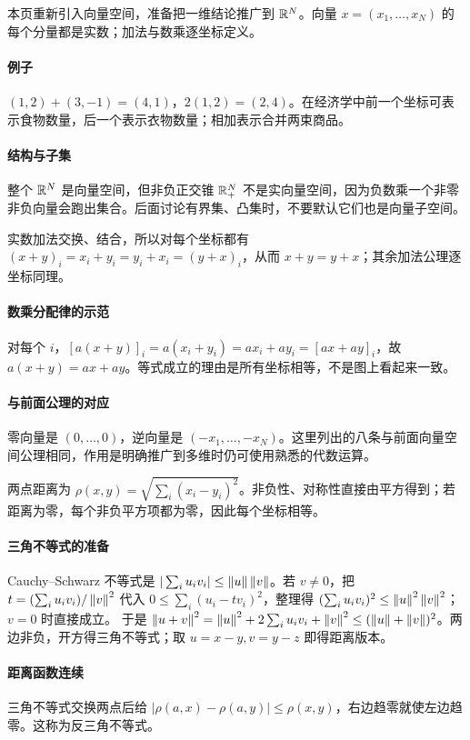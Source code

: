 本页重新引入向量空间，准备把一维结论推广到 $\mathbb{R}^N$。向量 $x=(x_1,\ldots,x_N)$ 的每个分量都是实数；加法与数乘逐坐标定义。
\paragraph{例子}$(1,2)+(3,-1)=(4,1)$，$2(1,2)=(2,4)$。在经济学中前一个坐标可表示食物数量，后一个表示衣物数量；相加表示合并两束商品。
\paragraph{结构与子集}整个 $\mathbb{R}^N$ 是向量空间，但非负正交锥 $\mathbb{R}_+^N$ 不是实向量空间，因为负数乘一个非零非负向量会跑出集合。后面讨论有界集、凸集时，不要默认它们也是向量子空间。

实数加法交换、结合，所以对每个坐标都有 $(x+y)_i=x_i+y_i=y_i+x_i=(y+x)_i$，从而 $x+y=y+x$；其余加法公理逐坐标同理。
\paragraph{数乘分配律的示范}对每个 $i$，$[a(x+y)]_i=a(x_i+y_i)=ax_i+ay_i=[ax+ay]_i$，故 $a(x+y)=ax+ay$。等式成立的理由是所有坐标相等，不是图上看起来一致。
\paragraph{与前面公理的对应}零向量是 $(0,\ldots,0)$，逆向量是 $(-x_1,\ldots,-x_N)$。这里列出的八条与前面向量空间公理相同，作用是明确推广到多维时仍可使用熟悉的代数运算。

两点距离为 $\rho(x,y)=\sqrt{\sum_i(x_i-y_i)^2}$。非负性、对称性直接由平方得到；若距离为零，每个非负平方项都为零，因此每个坐标相等。
\paragraph{三角不等式的准备}Cauchy--Schwarz 不等式是 $|\sum_i u_iv_i|\le\left\lVert u\right\rVert\left\lVert v\right\rVert$。若 $v\ne0$，把 $t=(\sum_i u_iv_i)/\left\lVert v\right\rVert^2$ 代入 $0\le\sum_i(u_i-tv_i)^2$，整理得 $(\sum_i u_iv_i)^2\le\left\lVert u\right\rVert^2\left\lVert v\right\rVert^2$；$v=0$ 时直接成立。
于是 $\left\lVert u+v\right\rVert^2=\left\lVert u\right\rVert^2+2\sum_i u_iv_i+\left\lVert v\right\rVert^2\le(\left\lVert u\right\rVert+\left\lVert v\right\rVert)^2$。两边非负，开方得三角不等式；取 $u=x-y,v=y-z$ 即得距离版本。
\paragraph{距离函数连续}三角不等式交换两点后给 $|\rho(a,x)-\rho(a,y)|\le\rho(x,y)$，右边趋零就使左边趋零。这称为反三角不等式。

